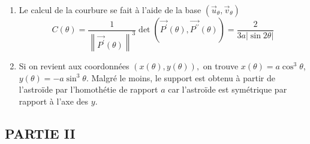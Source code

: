 \begin{enumerate}
\item  Le calcul de la courbure se fait \`{a} l'aide de la base $(%
\overrightarrow{u}_{\theta },\overrightarrow{v}_{\theta })$%
\[
C(\theta )=\frac{1}{\left\| \overrightarrow{P^{\prime }}(\theta )\right\|
^{3}}\det (\overrightarrow{P^{\prime }}(\theta ),\overrightarrow{P^{\prime
\prime }}(\theta ))=\frac{2}{3a\left| \sin 2\theta \right| } 
\]

\item  Si on revient aux coordonn\'{e}es $(x(\theta ),y(\theta )),$ on
trouve $x(\theta )=a\cos ^{3}\theta $, $y(\theta )=-a\sin ^{3}\theta .$
Malgr\'{e} le moins, le support est obtenu \`{a} partir de l'astro\"{i}de
par l'homoth\'{e}tie de rapport $a$ car l'astro\"{i}de est sym\'{e}trique
par rapport \`{a} l'axe des $y$.
\end{enumerate}

\subsection*{PARTIE II}

